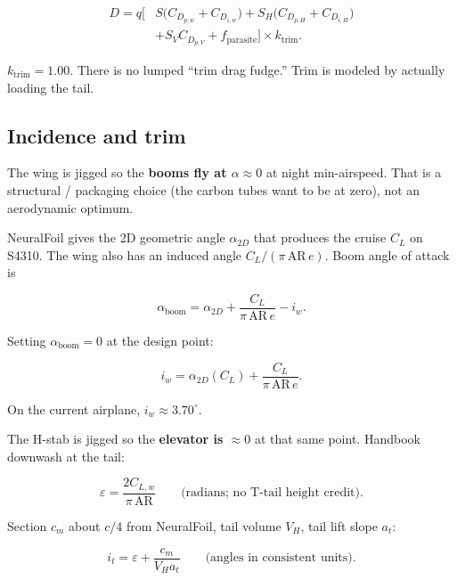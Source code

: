 \documentclass[11pt,letterpaper]{article}
\begin{document}
\begin{equation}
\begin{aligned}
  D = q \Big[&
      S \bigl(C_{D_{p,w}} + C_{D_{i,w}}\bigr)
    + S_H \bigl(C_{D_{p,H}} + C_{D_{i,H}}\bigr) \\
    &+ S_V C_{D_{p,V}}
    + f_\mathrm{parasite}
  \Bigr] \times k_\mathrm{trim}.
\end{aligned}
\label{eq:drag}
\end{equation}

$k_\mathrm{trim} = 1.00$. There is no lumped ``trim drag fudge.'' Trim is modeled by actually loading the tail.

\subsection{Incidence and trim}
\label{sec:trim}

The wing is jigged so the \textbf{booms fly at $\alpha \approx 0$} at night min-airspeed. That is a structural / packaging choice (the carbon tubes want to be at zero), not an aerodynamic optimum.

NeuralFoil gives the 2D geometric angle $\alpha_{2D}$ that produces the cruise $C_L$ on S4310. The wing also has an induced angle $C_L/(\pi\,\mathrm{AR}\,e)$. Boom angle of attack is

\begin{equation}
  \alpha_\mathrm{boom} = \alpha_{2D} + \frac{C_L}{\pi\,\mathrm{AR}\,e} - i_w.
\end{equation}

Setting $\alpha_\mathrm{boom}=0$ at the design point:

\begin{equation}
  i_w = \alpha_{2D}(C_L) + \frac{C_L}{\pi\,\mathrm{AR}\,e}.
\label{eq:iw}
\end{equation}

On the current airplane, $i_w \approx 3.70^\circ$.

The H-stab is jigged so the \textbf{elevator is $\approx 0$} at that same point. Handbook downwash at the tail:

\begin{equation}
  \varepsilon = \frac{2 C_{L,w}}{\pi\,\mathrm{AR}}
  \qquad \text{(radians; no T-tail height credit)}.
\label{eq:eps}
\end{equation}

Section $c_m$ about $c/4$ from NeuralFoil, tail volume $V_H$, tail lift slope $a_t$:

\begin{equation}
  i_t = \varepsilon + \frac{c_m}{V_H a_t}
  \qquad \text{(angles in consistent units)}.
\label{eq:it}
\end{equation}
\end{document}
